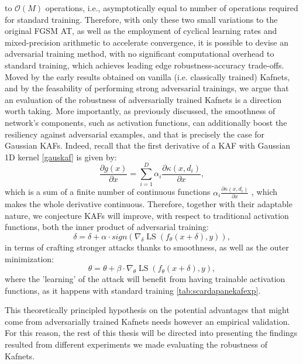 \documentclass[LaM,binding=0.6cm]{./packages/sapthesis/sapthesis}
\begin{document}
        to $\mathcal{O}(M)$ operations, i.e., asymptotically equal to number of operations required for standard training.
        Therefore, with only these two small variations to the original FGSM AT, as well as the employment of cyclical learning 
        rates and mixed-precision arithmetic to accelerate convergence, it is possible to devise an 
        adversarial training method, with no significant computational overhead to standard training,
        which achieves leading edge robustness-accuracy trade-offs.
        \newpage
        Moved by the early results obtained on vanilla (i.e. classically trained) Kafnets, and by the 
        feasability of performing strong adversarial trainings, we argue that an evaluation of the robustness of adversarially trained 
        Kafnets is a direction worth taking. More importantly, as previously discussed, the smoothness of network's components, such as 
        activation functions, can additionally boost the resiliency against adversarial examples, and that is precisely the case for Gaussian 
        KAFs. Indeed, recall that the first derivative of a KAF with Gaussian 1D kernel \ref{gauskaf} is given by:
        \begin{equation}
            \frac{\partial g(x)}{\partial x}=\sum_{i=1}^{D} \alpha_{i} \frac{\partial \kappa\left(x, d_{i}\right)}{\partial x},
        \end{equation}
        which is a sum of a finite number of continuous functions $\alpha_{i} \frac{\partial \kappa\left(x, d_{i}\right)}{\partial x}$
        , which makes the whole derivative continuous. Therefore, together with their adaptable nature, we conjecture
        KAFs will improve, with respect to traditional activation functions, both the inner product of adversarial training:
        \begin{equation}
            \delta = \delta + \alpha \cdot sign(\nabla_{\delta}\operatorname{LS}(f_\theta(x + \delta), y)),
        \end{equation}
        in terms of crafting stronger attacks thanks to smoothness, as well as the outer minimization:
        \begin{equation}
            \theta = \theta + \beta \cdot \nabla_{\theta}\operatorname{LS}(f_\theta(x + \delta), y),
        \end{equation}
        where the 'learning' of the attack will benefit from having trainable activation functions, as it happens with standard training
        \ref{tab:scardapanekafexp}.

        This theoretically principled hypothesis on the potential advantages that might come from adversarially trained Kafnets 
        needs however an empirical validation. For this reason, the rest of this thesis will be directed into presenting 
        the findings resulted from different experiments we made evaluating the robustness of Kafnets.
\end{document}
